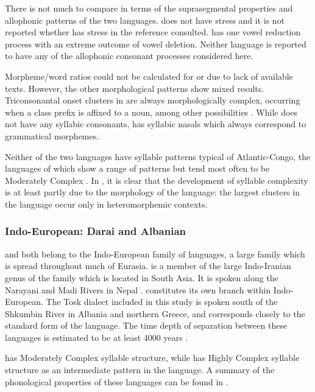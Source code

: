   There is not much to compare in terms of the suprasegmental properties and allophonic patterns of the two languages.  does not have stress and it is not reported whether  has stress in the reference consulted.  has one vowel reduction process with an extreme outcome of vowel deletion. Neither language is reported to have any of the allophonic consonant processes considered here.

  Morpheme/word ratios could not be calculated for  or  due to lack of available texts. However, the other morphological patterns show mixed results. Triconsonantal onset clusters in  are always morphologically complex, occurring when a class prefix is affixed to a noun, among other possibilities \citep[23--24]{Kawasha2003}. While  does not have any syllabic consonants,  has syllabic nasals which always correspond to grammatical morphemes.

  Neither of the two languages have syllable patterns typical of Atlantic-Congo, the languages of which show a range of patterns but tend most often to be Moderately Complex \citep{Maddieson2013a}. In , it is clear that the development of syllable complexity is at least partly due to the morphology of the language: the largest clusters in the language occur only in heteromorphemic contexts.

\subsubsection{{Indo-European:} {Darai} {and} {Albanian}}\label{sec:8.4.3.5}

   and  both belong to the Indo-European family of languages, a large family which is spread throughout much of Eurasia.  is a member of the large Indo-Iranian genus of the family which is located in South Asia. It is spoken along the Narayani and Madi Rivers in Nepal \citep{Dhakal2012}.  constitutes its own branch within Indo-European. The Tosk dialect included in this study is spoken south of the Shkumbin River in Albania and northern Greece, and corresponds closely to the standard form of the language. The time depth of separation between these languages is estimated to be at least 4000 years \citep[146]{Garrett2006}.

   has Moderately Complex syllable structure, while  has Highly Complex syllable structure as an intermediate pattern in the language. A summary of the phonological properties of these languages can be found in .

